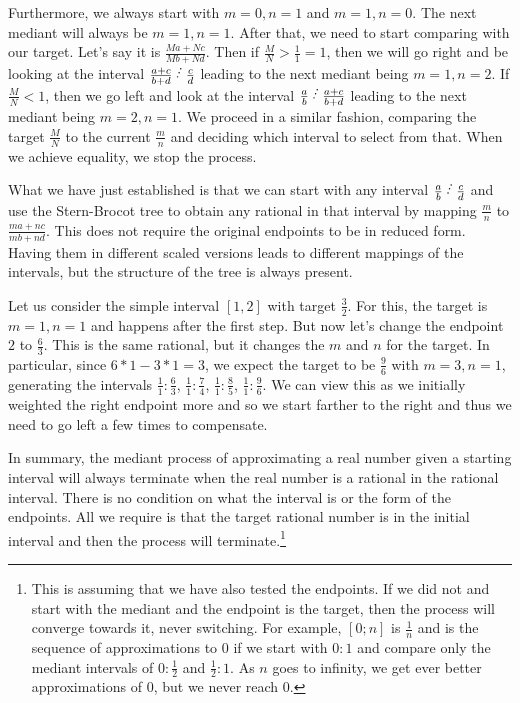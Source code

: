 \documentclass[12pt]{article}
\begin{document}
Furthermore, we always start with $m=0, n=1$ and $m=1, n=0$. The next mediant will always be $m=1, n=1$. After that, we need to start comparing with our target. Let's say it is $\frac{Ma + Nc}{Mb + Nd}$. Then if $\frac{M}{N} > \frac{1}{1} = 1$, then we will go right and be looking at the interval $\frac{a+c}{b+d} \lte  \frac{c}{d}$ leading to the next mediant being $m=1, n=2$. If $\frac{M}{N} < 1$, then we go left and look at the interval $\frac{a}{b} \lte \frac{a+c}{b+d}$ leading to the next mediant being $m=2, n=1$. We proceed in a similar fashion, comparing the target $\frac{M}{N}$ to the current $\frac{m}{n}$ and deciding which interval to select from that. When we achieve equality, we stop the process.

What we have just established is that we can start with any interval $\frac{a}{b} \lte \frac{c}{d}$ and use the Stern-Brocot tree to obtain any rational in that interval by mapping $\frac{m}{n}$ to $\frac{ma + nc}{mb + nd}$. This does not require the original endpoints to be in reduced form. Having them in different scaled versions leads to different mappings of the intervals, but the structure of the tree is always present. 

Let us consider the simple interval $[1, 2]$ with target $\frac{3}{2}$. For this, the target is $m=1, n=1$ and happens after the first step. But now let's change the endpoint $2$ to $\frac{6}{3}$. This is the same rational, but it changes the $m$ and $n$ for the target. In particular, since $6*1-3*1 = 3$, we expect the target to be $\frac{9}{6}$ with $m=3, n=1$, generating the intervals $\frac{1}{1} :\frac{6}{3}$,  $\frac{1}{1} :\frac{7}{4}$, $\frac{1}{1} :\frac{8}{5}$, $\frac{1}{1} :\frac{9}{6}$. We can view this as we initially weighted the right endpoint more and so we start farther to the right and thus we need to go left a few times to compensate. 

In summary, the mediant process of approximating a real number given a starting interval will always terminate when the real number is a rational in the rational interval. There is no condition on what the interval is or the form of the endpoints. All we require is that the target rational number is in the initial interval and then the process will terminate.\footnote{This is assuming that we have also tested the endpoints. If we did not and start with the mediant and the endpoint is the target, then the process will converge towards it, never switching. For example, $[0; n]$ is $\frac{1}{n}$ and is the sequence of approximations to $0$ if we start with $0:1$ and compare only the mediant intervals of $0:\frac{1}{2}$ and $\frac{1}{2}:1$. As $n$ goes to infinity, we get ever better approximations of $0$, but we never reach $0$.}






\medskip

\normalem %

\printbibliography
\end{document}
